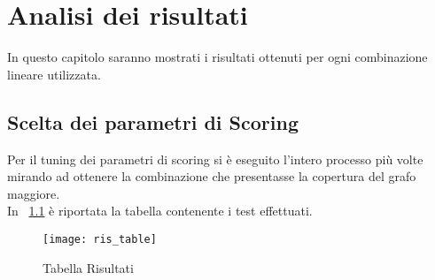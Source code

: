 
\chapter{Analisi dei risultati}
In questo capitolo saranno mostrati i risultati ottenuti per ogni combinazione
lineare utilizzata.

\section{Scelta dei parametri di Scoring}
Per il tuning dei parametri di scoring si è eseguito l'intero processo più volte
mirando ad ottenere la combinazione che presentasse la copertura del grafo
maggiore.\\
In \figurename~\ref{} è riportata la tabella contenente i test effettuati.

\begin{figure}[!htbp]
  \texttt{[image: ris\_table]}
  \caption{Tabella Risultati}
  \label{ris_table}
\end{figure}
